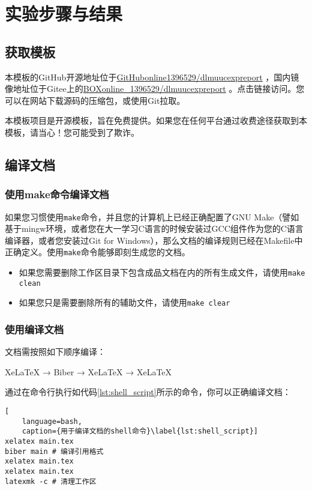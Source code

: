 \chapter{实验步骤与结果}

\section{获取模板}

本模板的GitHub开源地址位于\href{https://github.com/GitHubonline1396529/dlmuucexpreport}{GitHubonline1396529/dlmuucexpreport} ，国内镜像地址位于Gitee上的\href{https://gitee.com/BOXonline_1396529/dlmuucexpreport}{BOXonline\_1396529/dlmuucexpreport} 。点击链接访问。您可以在网站下载源码的压缩包，或使用Git拉取。

本模板项目是开源模板，旨在免费提供。如果您在任何平台通过收费途径获取到本模板，请当心！您可能受到了欺诈。

\section{编译文档}

\subsection{使用make命令编译文档}

如果您习惯使用\texttt{make}命令，并且您的计算机上已经正确配置了GNU Make（譬如基于mingw环境，或者您在大一学习C语言的时候安装过GCC组件作为您的C语言编译器，或者您安装过Git for Windows），那么文档的编译规则已经在Makefile中正确定义。使用\texttt{make}命令能够即刻生成您的文档。

\begin{itemize}
    \item 如果您需要删除工作区目录下包含成品文档在内的所有生成文件，请使用\texttt{make clean}
    \item 如果您只是需要删除所有的辅助文件，请使用\texttt{make clear}
\end{itemize}

\subsection{使用\XeLaTeX 编译文档}

文档需按照如下顺序编译：

XeLaTeX → Biber → XeLaTeX → XeLaTeX

通过在命令行执行如代码\ref{lst:shell_script}所示的命令，你可以正确编译文档：

\begin{lstlisting}[
    language=bash,
    caption={用于编译文档的shell命令}\label{lst:shell_script}]
xelatex main.tex
biber main # 编译引用格式
xelatex main.tex
xelatex main.tex
latexmk -c # 清理工作区
\end{lstlisting}